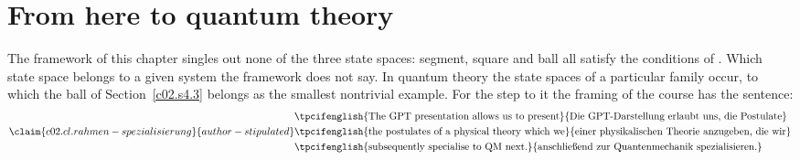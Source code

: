 \section{From here to quantum theory}\label{c02.s8}

The framework of this chapter singles out none of the three state spaces: segment, square
and ball all satisfy the conditions of . Which state space belongs to a given
system the framework does not say. In quantum theory the state spaces of a particular
family occur, to which the ball of Section~\ref{c02.s4.3} belongs as the smallest
nontrivial example. For the step to it the framing of the course has the sentence:
\begin{equation}\label{c02.eq.rahmen-spezialisierung}\claim{c02.cl.rahmen-spezialisierung}{author-stipulated}
  \begin{aligned}
    &\text{\tpcifenglish{The GPT presentation allows us to present}{Die GPT-Darstellung erlaubt uns, die Postulate}} \\
    &\text{\tpcifenglish{the postulates of a physical theory which we}{einer physikalischen Theorie anzugeben, die wir}} \\
    &\text{\tpcifenglish{subsequently specialise to QM next.}{anschließend zur Quantenmechanik spezialisieren.}}
  \end{aligned}
\end{equation}

